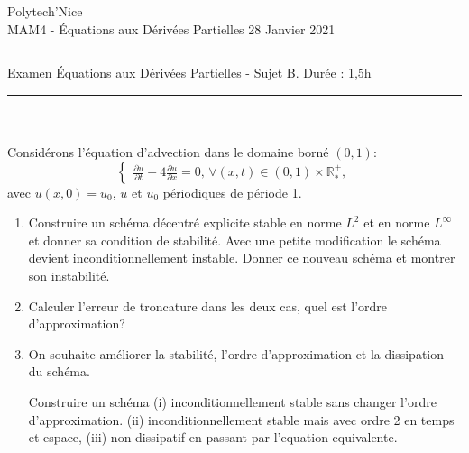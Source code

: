 \documentclass[12pt,a4paper]{article}
\begin{document}
 \hfill Polytech'Nice\\
\noindent MAM4 - \'Equations aux D\'eriv\'ees Partielles \hfill 
28 Janvier 2021 \\

\hrule

\vspace{0.6cm}
\centerline {\large \sc Examen \'Equations aux D\'eriv\'ees Partielles - Sujet B. Dur\'ee : 1,5h}
\vspace{0.6cm}


\hrule
\vspace{0.7cm}
\\

\\%
\noindent Consid\'erons l'\'equation d'advection dans le domaine born\'e $(0,1)$:
$$
\begin{cases}
\displaystyle\frac{\partial u}{\partial t}-4\frac{\partial u}{\partial
  x}=0,\, \forall (x,t)\in(0,1)\times\mathbb{R}^+_*,
\end{cases}
$$
avec $u(x, 0) = u_0$, $u$ et $u_0$ p\'eriodiques de p\'eriode 1.
\begin{enumerate}
\item Construire un schéma décentré explicite stable en norme $L^2$ et en norme $L^{\infty}$ et donner sa condition de stabilité. Avec une petite modification le schéma devient inconditionnellement instable. Donner ce nouveau schéma et montrer son instabilité. 

\item Calculer l'erreur de troncature dans les deux cas, quel est l'ordre d'approximation?

\item  On souhaite améliorer la stabilité, l'ordre d'approximation et la dissipation du schéma.

Construire un schéma (i) inconditionnellement stable sans changer l'ordre d'approximation. (ii) inconditionnellement stable mais avec ordre 2 en temps et espace, (iii) non-dissipatif en passant par l'equation equivalente.


\end{enumerate}
\end{document}
